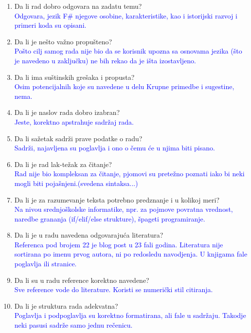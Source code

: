 \documentclass[a4paper]{report}
\newcommand{\odgovor}[1]{\textcolor{blue}{#1}}
\begin{document}
\begin{enumerate}
\item Da li rad dobro odgovara na zadatu temu?\\
\odgovor{
Odgovara, jezik F\# njegove osobine, karakteristike, kao i istorijski razvoj i primeri koda su opisani.
}
\item Da li je nešto važno propušteno?\\
\odgovor{
Pošto cilj samog rada nije bio da se korisnik upozna sa osnovama jezika (što je navedeno u zaključku) ne bih rekao da je išta izostavljeno.
}
\item Da li ima suštinskih grešaka i propusta?\\
\odgovor{
Osim potencijalnih koje su navedene u delu Krupne primedbe i sugestine, nema.
}
\item Da li je naslov rada dobro izabran?\\
\odgovor{
Jeste, korektno apstrahuje sadržaj rada.
}
\item Da li sažetak sadrži prave podatke o radu?\\
\odgovor{
Sadrži, najavljena su poglavlja i ono o čemu će u njima biti pisano.
}

\item Da li je rad lak-težak za čitanje?\\
\odgovor{
Rad nije bio kompleksan za čitanje, pjomovi su pretežno poznati iako bi neki mogli biti pojašnjeni.(svedena sintaksa...)
}

\item Da li je za razumevanje teksta potrebno predznanje i u kolikoj meri?\\
\odgovor{
Na nivou srednjoškolske informatike, npr. za pojmove povratna vrednost, naredbe grananja (if/elif/else strukture), špageti programiranje.
}

\item Da li je u radu navedena odgovarajuća literatura?\\
\odgovor{
Referenca pod brojem 22 je blog post u 23 fali godina. Literatura nije sortirana po imenu prvog autora, ni po redosledu navodjenja. U knjigama fale poglavlja ili stranice.
}

\item Da li su u radu reference korektno navedene?\\
\odgovor{
Sve reference vode do literature. Koristi se numerički stil citiranja.
}

\item Da li je struktura rada adekvatna?\\
\odgovor{
Poglavlja i podpoglavlja su korektno formatirana, ali fale u sadržaju. Takodje neki pasusi sadrže samo jednu rečenicu.
}


\end{enumerate}
\end{document}
